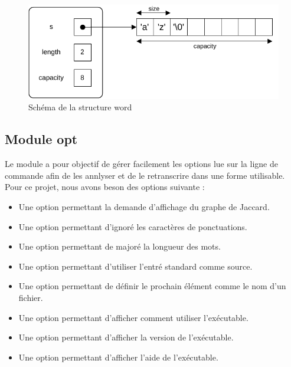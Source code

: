 \documentclass[a4paper, 12pt]{article}
\newcommand{\code}{\commandbox}
\begin{document}
\begin{figure}[H]
    \centering
    \begin{tcolorbox}[enhanced,
        colback=white,
        colframe=codeblue,
        fonttitle=\bfseries,
        title=Schéma,
        boxrule=2pt,
        width=0.8\textwidth]
        \includegraphics[width=\textwidth]{word_schema.pdf}
    \end{tcolorbox}
    \caption{Schéma de la structure word}
    \label{fig:word_schema}
\end{figure}



\subsection{Module opt}

Le module \code{opt} a pour objectif de gérer facilement les options lue sur la ligne de commande afin de les annlyser et de le retranscrire dans une forme utilisable. Pour ce projet, nous avons beson des options suivante :

\begin{itemize}
    \item Une option permettant la demande d'affichage du graphe de Jaccard.
    \item Une option permettant d'ignoré les caractères de ponctuations.
    \item Une option permettant de majoré la longueur des mots.
    \item Une option permettant d'utiliser l'entré standard comme source.
    \item Une option permettant de définir le prochain élément comme le nom d'un fichier.
    \item Une option permettant d'afficher comment utiliser l'exécutable.
    \item Une option permettant d'afficher la version de l'exécutable.
    \item Une option permettant d'afficher l'aide de l'exécutable.
\end{itemize}
\end{document}
